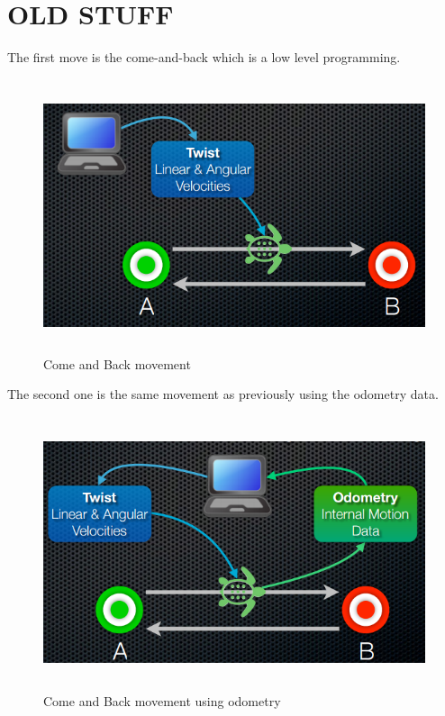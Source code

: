 \documentclass[aps,letterpaper,11pt]{revtex4}
\newcommand\launchstyle{\lstset{
    language=xml,
    tabsize=3,
    frame=tb,
    rulesepcolor=\color{gray},
    xleftmargin=20pt,
    framexleftmargin=15pt,
    otherkeywords={node,include,param},
    keywordstyle=\ttb\color{deepblue},
    commentstyle=\color{orange},
    stringstyle=\color{deepgreen},
    breaklines=true,
    showstringspaces=false,
    basicstyle=\ttm,
    emph={pkg,args,value,file,name,type},
    emphstyle={\color{deepred}}}
    }
\begin{document}
\section{OLD STUFF}
The first move is the come-and-back which is a low level programming.
\begin{figure}[H]
	\centering
	\includegraphics[height=8cm]{come-and-back.png}
	\caption{Come and Back movement}
	\label{fig: Come and Back movement}    
\end{figure}

The second one is the same movement as previously using the odometry data.
\begin{figure}[H]
	\centering
	\includegraphics[height=8cm]{come-and-back-switch.png}
	\caption{Come and Back movement using odometry}
	\label{fig: Come and Back movement using odometry}    
\end{figure}
\end{document}
